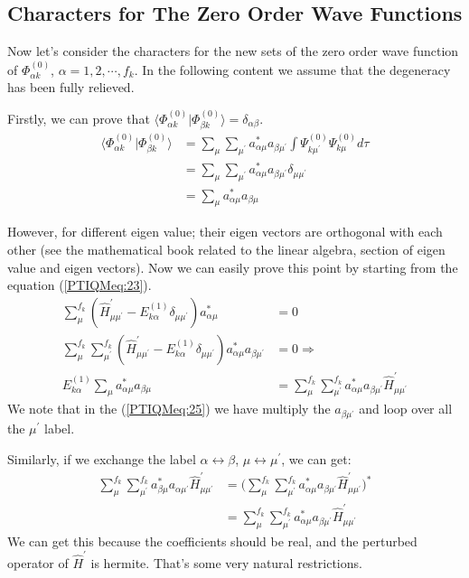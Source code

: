 \subsection{Characters for The Zero Order Wave Functions}
%
%
Now let's consider the characters for the new sets of the zero order
wave function of $\Phi^{(0)}_{\alpha k}$, $\alpha = 1,2,\cdots,
f_{k}$. In the following content we assume that the degeneracy has
been fully relieved.

Firstly, we can prove that $\langle\Phi^{(0)}_{\alpha
k}|\Phi^{(0)}_{\beta k}\rangle = \delta_{\alpha\beta}$.
\begin{align}\label{}
\langle\Phi^{(0)}_{\alpha k}|\Phi^{(0)}_{\beta k}\rangle &=
\sum_{\mu}\sum_{\mu^{'}}a_{\alpha\mu}^{*}a_{\beta\mu^{'}}
\int\Psi_{k\mu^{'}}^{(0)}\Psi_{k\mu}^{(0)}d\tau \nonumber \\
&=\sum_{\mu}\sum_{\mu^{'}}a_{\alpha\mu}^{*}a_{\beta\mu^{'}}
\delta_{\mu\mu^{'}} \nonumber \\
&=\sum_{\mu}a_{\alpha\mu}^{*}a_{\beta\mu}
\end{align}

However, for different eigen value; their eigen vectors are
orthogonal with each other (see the mathematical book related to the
linear algebra, section of eigen value and eigen vectors). Now we
can easily prove this point by starting from the equation
(\ref{PTIQMeq:23}).
\begin{align}\label{PTIQMeq:25}
\sum_{\mu}^{f_{k}}(\hat{H}^{'}_{\mu\mu^{'}} -
E^{(1)}_{k\alpha}\delta_{\mu\mu^{'}})a_{\alpha\mu}^{*} &= 0 \nonumber \\
\sum_{\mu}^{f_{k}}\sum_{\mu^{'}}^{f_{k}}(\hat{H}^{'}_{\mu\mu^{'}} -
E^{(1)}_{k\alpha}\delta_{\mu\mu^{'}})a_{\alpha\mu}^{*}
a_{\beta\mu^{'}} &=
0 \Rightarrow \nonumber \\
E^{(1)}_{k\alpha}\sum_{\mu}a_{\alpha\mu}^{*}a_{\beta\mu} &=
\sum_{\mu}^{f_{k}}\sum_{\mu^{'}}^{f_{k}}a_{\alpha\mu}^{*}
a_{\beta\mu^{'}}\hat{H}^{'}_{\mu\mu^{'}}
\end{align}
We note that in the (\ref{PTIQMeq:25}) we have multiply the
$a_{\beta\mu^{'}}$ and loop over all the $\mu^{'}$ label.

Similarly, if we exchange the label $\alpha\leftrightarrow\beta$,
$\mu\leftrightarrow\mu^{'}$, we can get:
\begin{align}\label{}
\sum_{\mu}^{f_{k}}\sum_{\mu^{'}}^{f_{k}}a_{\beta\mu}^{*}
a_{\alpha\mu^{'}}\hat{H}^{'}_{\mu\mu^{'}} &=
\Bigg(\sum_{\mu}^{f_{k}}\sum_{\mu^{'}}^{f_{k}}a_{\alpha\mu}^{*}
a_{\beta\mu^{'}}\hat{H}^{'}_{\mu\mu^{'}}\Bigg)^{*} \nonumber \\
&=\sum_{\mu}^{f_{k}}\sum_{\mu^{'}}^{f_{k}}a_{\alpha\mu}^{*}
a_{\beta\mu^{'}}\hat{H}^{'}_{\mu\mu^{'}}
\end{align}
We can get this because the coefficients should be real, and the
perturbed operator of $\hat{H}^{'}$ is hermite. That's some very
natural restrictions.


